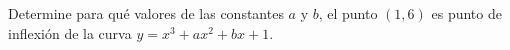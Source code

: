 \item Determine para qué valores de las constantes $a$ y $b$, el punto $(1, 6)$ es punto de inflexión de la curva $y = x^3 + ax^2 + bx + 1$.
